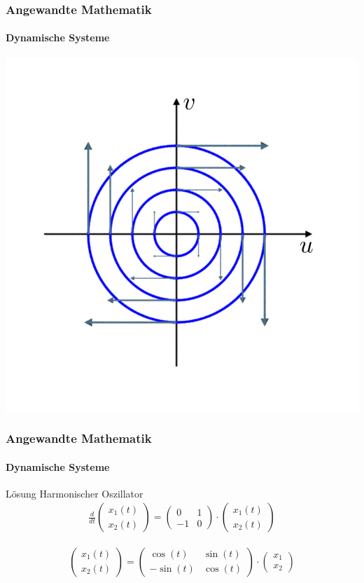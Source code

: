 \documentclass{beamer}
\begin{document}
 \begin{frame}
    \frametitle{Angewandte Mathematik}
\framesubtitle{Dynamische Systeme }
\center
\includegraphics[scale=0.35]{images/harmonicoszillatorphasespace}
 \end{frame}


 \begin{frame}
    \frametitle{Angewandte Mathematik}
\framesubtitle{Dynamische Systeme }

\begin{block}{Lösung Harmonischer Oszillator}
  \begin{align*}
    \frac{d}{dt}\begin{pmatrix}
        x_1(t) \\ x_2(t)
    \end{pmatrix} = 
\begin{pmatrix}
    0 & 1  \\ -1 & 0
\end{pmatrix} \cdot
\begin{pmatrix} 
    x_1(t) \\ x_2(t)
\end{pmatrix} 
\end{align*}

    \begin{align*}
        \begin{pmatrix}
            x_1(t) \\ x_2(t)
        \end{pmatrix} = \begin{pmatrix}
            \cos(t) & \sin(t)  \\ - \sin(t) & \cos(t)
        \end{pmatrix}   \cdot \begin{pmatrix}
            x_1\\ x_2
        \end{pmatrix}
    \end{align*}
\end{block}
 \end{frame}
\end{document}
